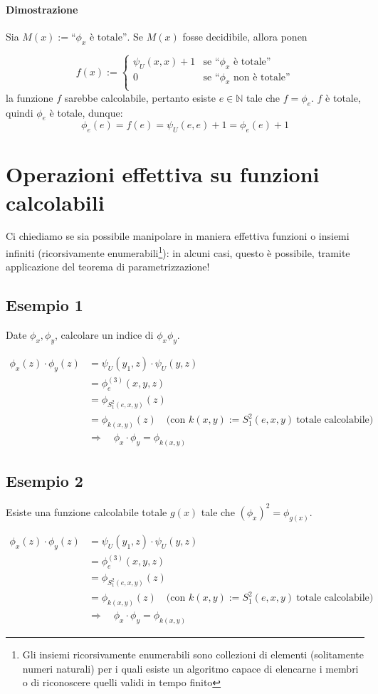 	\paragraph{Dimostrazione}
	Sia $M(x) := \text{``$\phi_x$ è totale''}$. Se $M(x)$ fosse decidibile, allora ponen
	
	\begin{equation}
	f(x) := \begin{cases}
	\psi_U(x,x) + 1 & \text{se ``$\phi_x$ è totale''}\\
	0 & \text{se ``$\phi_x$ non è totale''}\\
	\end{cases}
	\end{equation}
	la funzione $f$ sarebbe calcolabile, pertanto esiste $e \in \mathbb{N}$ tale che $f= \phi_e$. $f$ è totale, quindi $\phi_e$ è totale, dunque:
	$$
	\phi_e(e) = f(e) = \psi_U(e,e) + 1 = \phi_e(e) +1
	$$
	\section{Operazioni effettiva su funzioni calcolabili}
	Ci chiediamo se sia possibile manipolare in maniera effettiva funzioni o insiemi infiniti (ricorsivamente enumerabili\footnote{Gli insiemi ricorsivamente enumerabili sono collezioni di elementi (solitamente numeri naturali) per i quali esiste un algoritmo capace di elencarne i membri o di riconoscere quelli validi in tempo finito}): in alcuni casi, questo è possibile, tramite applicazione del teorema di parametrizzazione!
	
	\subsection{Esempio 1}
	Date $\phi_x, \phi_y$, calcolare un indice di $\phi_x\phi_y$.
	
	$$
	\begin{aligned}
		\phi_x(z)\cdot \phi_y(z)
		&=
		\psi_U(y_1,z)\cdot \psi_U(y,z) \\
		&= \phi^{(3)}_e(x,y,z) \\
		&= \phi_{S_1^2(e,x,y)}(z) \\
		&= \phi_{k(x,y)}(z)
		\quad
		\big(\text{con } k(x,y):=S_1^2(e,x,y)\ \text{totale calcolabile}\big) \\
		&\Longrightarrow\quad
		\phi_x\cdot \phi_y = \phi_{k(x,y)}
	\end{aligned}
	$$
	
		\subsection{Esempio 2}
		Esiste una funzione calcolabile totale $g(x)$ tale che $(\phi_x)^2 = \phi_{g(x)}$.
	
	$$
	\begin{aligned}
		\phi_x(z)\cdot \phi_y(z)
		&=
		\psi_U(y_1,z)\cdot \psi_U(y,z) \\
		&= \phi^{(3)}_e(x,y,z) \\
		&= \phi_{S_1^2(e,x,y)}(z) \\
		&= \phi_{k(x,y)}(z)
		\quad
		\big(\text{con } k(x,y):=S_1^2(e,x,y)\ \text{totale calcolabile}\big) \\
		&\Longrightarrow\quad
		\phi_x\cdot \phi_y = \phi_{k(x,y)}
	\end{aligned}
	$$